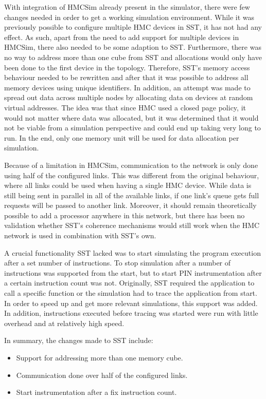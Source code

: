 With integration of HMCSim already present in the simulator, there were few changes needed in order to get a working simulation environment. While it was previously possible to configure multiple HMC devices in SST, it has not had any effect. As such, apart from the need to add support for multiple devices in HMCSim, there also needed to be some adaption to SST. Furthermore, there was no way to address more than one cube from SST and allocations would only have been done to the first device in the topology. Therefore, SST's memory access behaviour needed to be rewritten and after that it was possible to address all memory devices using unique identifiers. In addition, an attempt was made to spread out data across multiple nodes by allocating data on devices at random virtual addresses. The idea was that since HMC used a closed page policy, it would not matter where data was allocated, but it was determined that it would not be viable from a simulation perspective and could end up taking very long to run. In the end, only one memory unit will be used for data allocation per simulation.
\bigskip

Because of a limitation in HMCSim, communication to the network is only done using half of the configured links. This was different from the original behaviour, where all links could be used when having a single HMC device. While data is still being sent in parallel in all of the available links, if one link's queue gets full requests will be passed to another link. Moreover, it should remain theoretically possible to add a processor anywhere in this network, but there has been no validation whether SST's coherence mechanisms would still work when the HMC network is used in combination with SST's own. 
\bigskip

A crucial functionality SST lacked was to start simulating the program execution after a set number of instructions. To stop simulation after a number of instructions was supported from the start, but to start PIN instrumentation after a certain instruction count was not. Originally, SST required the application to call a specific function or the simulation had to trace the application from start. In order to speed up and get more relevant simulations, this support was added. In addition, instructions executed before tracing was started were run with little overhead and at relatively high speed.
\bigskip

In summary, the changes made to SST include:
\begin{itemize}
  \item Support for addressing more than one memory cube.
  \item Communication done over half of the configured links.
  \item Start instrumentation after a fix instruction count.
\end{itemize}
\bigskip

